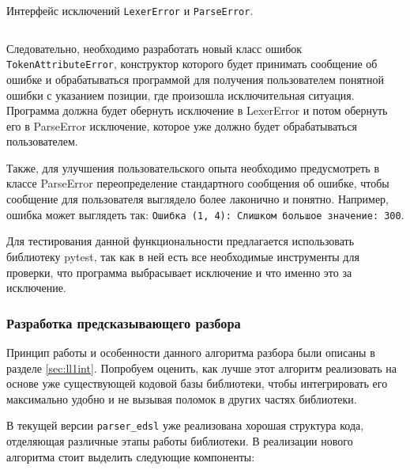 \documentclass[14pt, russian]{scrartcl}
\begin{document}
\begin{listing}[H]
	\caption{Интерфейс исключений \texttt{LexerError} и \texttt{ParseError}.}
	\label{lst:curerrros}
	\inputminted[style=bw, frame=single,fontsize = \footnotesize, linenos=false, xleftmargin = 1.5em]{python}{./listings/curerrros.py}
\end{listing}

Следовательно, необходимо разработать новый класс ошибок \texttt{TokenAttributeError}, конструктор которого будет принимать
сообщение об ошибке и обрабатываться программой для получения пользователем понятной ошибки с указанием позиции,
где произошла исключительная ситуация. Программа должна будет обернуть исключение в LexerError и потом обернуть его
в ParseError исключение, которое уже должно будет обрабатываться пользователем.

Также, для улучшения пользовательского
опыта необходимо предусмотреть в классе ParseError переопределение стандартного сообщения об ошибке, чтобы
сообщение для пользователя выглядело более лаконично и понятно.
Например, ошибка может выглядеть так:
\texttt{Ошибка (1, 4): Слишком большое значение: 300}.

Для тестирования данной функциональности предлагается использовать библиотеку pytest, так как в ней есть все необходимые
инструменты для проверки, что программа выбрасывает исключение и что именно это за исключение.

\subsubsection{Разработка предсказывающего разбора}

Принцип работы и особенности данного алгоритма разбора были описаны в разделе \ref{sec:ll1int}. Попробуем оценить,
как лучше этот алгоритм реализовать на основе уже существующей кодовой базы библиотеки, чтобы интегрировать его
максимально удобно и не вызывая поломок в других частях библиотеки.

В текущей версии \texttt{parser\_edsl} уже реализована хорошая структура кода, отделяющая различные этапы работы
библиотеки. В реализации нового алгоритма стоит выделить следующие компоненты:
\end{document}
